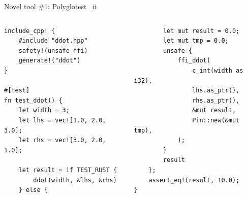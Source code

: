 \documentclass[10pt,aspectratio=169]{beamer}
\begin{document}
\begin{frame}[fragile]{Novel tool \#1: Polyglotest \ ii}
    \begin{columns}[T,onlytextwidth]
        \centering
            \begin{verbatim}
include_cpp! {
    #include "ddot.hpp"
    safety!(unsafe_ffi)
    generate!("ddot")
}

#[test]
fn test_ddot() {
    let width = 3;
    let lhs = vec![1.0, 2.0, 3.0];
    let rhs = vec![3.0, 2.0, 1.0];

    let result = if TEST_RUST {
        ddot(width, &lhs, &rhs)
    } else {
            \end{verbatim}
            \begin{verbatim}
        let mut result = 0.0;
        let mut tmp = 0.0;
        unsafe {
            ffi_ddot(
                c_int(width as i32),
                lhs.as_ptr(),
                rhs.as_ptr(),
                &mut result,
                Pin::new(&mut tmp),
            );
        }
        result
    };
    assert_eq!(result, 10.0);
}
            \end{verbatim}
    \end{columns}
\end{frame}
\end{document}

